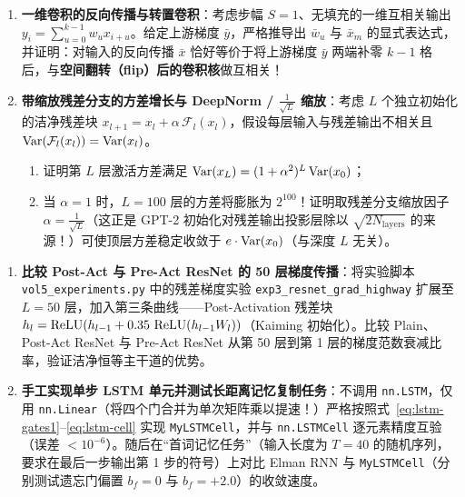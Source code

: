 
\begin{enumerate}
  \item[\textbf{5.3.3}] \textbf{一维卷积的反向传播与转置卷积}：考虑步幅 $S=1$、无填充的一维互相关输出 $y_i = \sum_{u=0}^{k-1} w_u x_{i+u}$。给定上游梯度 $\bar{y}$，严格推导出 $\bar{w}_u$ 与 $\bar{x}_m$ 的显式表达式，并证明：对输入的反向传播 $\bar{x}$ 恰好等价于将上游梯度 $\bar{y}$ 两端补零 $k-1$ 格后，与\textbf{空间翻转（flip）后的卷积核}做互相关！

  \item[\textbf{5.3.4}] \textbf{带缩放残差分支的方差增长与 DeepNorm / $\frac{1}{\sqrt{L}}$ 缩放}：考虑 $L$ 个独立初始化的洁净残差块 $x_{l+1} = x_l + \alpha\,\mathcal{F}_l(x_l)$，假设每层输入与残差输出不相关且 $\operatorname{Var}(\mathcal{F}_l(x_l)) = \operatorname{Var}(x_l)$。
  \begin{enumerate}
    \item 证明第 $L$ 层激活方差满足 $\operatorname{Var}(x_L) = (1 + \alpha^2)^L \operatorname{Var}(x_0)$；
    \item 当 $\alpha = 1$ 时，$L=100$ 层的方差将膨胀为 $2^{100}$！证明取残差分支缩放因子 $\alpha = \frac{1}{\sqrt{L}}$（这正是 GPT-2 初始化对残差输出投影层除以 $\sqrt{2 N_{\text{layers}}}$ 的来源！）可使顶层方差稳定收敛于 $e \cdot \operatorname{Var}(x_0)$（与深度 $L$ 无关）。
  \end{enumerate}
\end{enumerate}


\begin{enumerate}
  \item[\textbf{5.3.5}] \textbf{比较 Post-Act 与 Pre-Act ResNet 的 50 层梯度传播}：将实验脚本 \texttt{vol5\_experiments.py} 中的残差梯度实验 \texttt{exp3\_resnet\_grad\_highway} 扩展至 $L = 50$ 层，加入第三条曲线——Post-Activation 残差块 $h_l = \operatorname{ReLU}(h_{l-1} + 0.35\,\operatorname{ReLU}(h_{l-1} W_l))$（Kaiming 初始化）。比较 Plain、Post-Act ResNet 与 Pre-Act ResNet 从第 50 层到第 1 层的梯度范数衰减比率，验证洁净恒等主干道的优势。

  \item[\textbf{5.3.6}] \textbf{手工实现单步 LSTM 单元并测试长距离记忆复制任务}：不调用 \texttt{nn.LSTM}，仅用 \texttt{nn.Linear}（将四个门合并为单次矩阵乘以提速！）严格按照式~\eqref{eq:lstm-gates1}--\eqref{eq:lstm-cell} 实现 \texttt{MyLSTMCell}，并与 \texttt{nn.LSTMCell} 逐元素精度互验（误差 $< 10^{-6}$）。随后在“首词记忆任务”（输入长度为 $T = 40$ 的随机序列，要求在最后一步输出第 1 步的符号）上对比 Elman RNN 与 \texttt{MyLSTMCell}（分别测试遗忘门偏置 $b_f = 0$ 与 $b_f = +2.0$）的收敛速度。
\end{enumerate}

